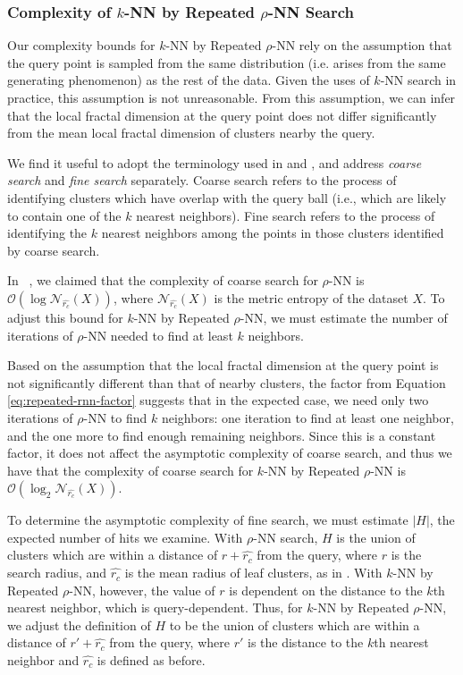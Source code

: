 \subsubsection{Complexity of \texorpdfstring{$k$}{k}-NN by Repeated \texorpdfstring{$\rho$}{p}-NN Search}
\label{subsubsec:methods:repeated-rnn-complexity}

Our complexity bounds for $k$-NN by Repeated $\rho$-NN rely on the assumption that the query point is sampled from the same distribution (i.e. arises from the same generating phenomenon) as the rest of the data.
Given the uses of $k$-NN search in practice, this assumption is not unreasonable.
From this assumption, we can infer that the local fractal dimension at the query point does not differ significantly from the mean local fractal dimension of clusters nearby the query.

We find it useful to adopt the terminology used in \cite{ishaq2019clustered} and \cite{yu2015entropy}, and address \emph{coarse search} and \emph{fine search} separately.
Coarse search refers to the process of identifying clusters which have overlap with the query ball (i.e., which are likely to contain one of the $k$ nearest neighbors). 
Fine search refers to the process of identifying the $k$ nearest neighbors among the points in those clusters identified by coarse search.

In ~\cite{ishaq2019clustered}, we claimed that the complexity of coarse search for $\rho$-NN is $\mathcal{O}(\log\mathcal{N}_{\hat{r_c}}(X))$, 
where $\mathcal{N}_{\hat{r_c}}(X)$ is the metric entropy of the dataset $X$. 
To adjust this bound for $k$-NN by Repeated $\rho$-NN, we must estimate the number of iterations of $\rho$-NN needed to find at least $k$ neighbors.

Based on the assumption that the local fractal dimension at the query point is not significantly different than that of nearby clusters, the factor from Equation \ref{eq:repeated-rnn-factor} suggests that in the expected case, we need only two iterations of $\rho$-NN to find $k$ neighbors:
one iteration to find at least one neighbor, and the one more to find enough remaining neighbors.
Since this is a constant factor, it does not affect the asymptotic complexity of coarse search, and thus we have that the complexity of coarse search for $k$-NN by Repeated $\rho$-NN is $\mathcal{O}(\log_2\mathcal{N}_{\hat{r_c}}(X))$.

To determine the asymptotic complexity of fine search, we must estimate $|H|$, the expected number of hits we examine.
With $\rho$-NN search, $H$ is the union of clusters which are within a distance of $r + \hat{r_c}$ from the query, where $r$ is the search radius, and $\hat{r_c}$ is the mean radius of leaf clusters, as in \cite{yu2015entropy}.
With $k$-NN by Repeated $\rho$-NN, however, the value of $r$ is dependent on the distance to the $k$th nearest neighbor, which is query-dependent.
Thus, for $k$-NN by Repeated $\rho$-NN, we adjust the definition of $H$ to be the union of clusters which are within a distance of $r' + \hat{r_c}$ from the query, where $r'$ is the distance to the $k$th nearest neighbor and $\hat{r_c}$ is defined as before.

